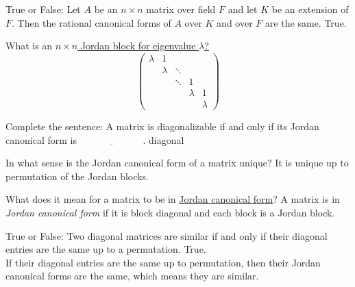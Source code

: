\documentclass[avery5371,grid]{flashcards}
\newcommand{\blank}{$\; \underline{\hspace{1in}} \; $}
\begin{document}
\begin{flashcard}{True or False: Let $A$ be an $n \times n$ matrix over field $F$ and let $K$ be an extension of $F$. Then the rational canonical forms of $A$ over $K$ and over $F$ are the same. }
 True.
\end{flashcard}

\begin{flashcard}{What is an \underline{$n \times n$ Jordan block for eigenvalue $\lambda$?}}
 $$
 \left (
 \begin{array}{ccccc}
      \lambda & 1 &&& \\
      & \lambda & \ddots && \\
      && \ddots & 1 & \\
      &&& \lambda & 1 \\
      &&&& \lambda
 \end{array}
 \right )
 $$
\end{flashcard}

\begin{flashcard}{Complete the sentence: A matrix is diagonalizable if and only if its Jordan canonical form is \blank .}
 diagonal
\end{flashcard}

\begin{flashcard}{In what sense is the Jordan canonical form of a matrix unique?}
 It is unique up to permutation of the Jordan blocks.
\end{flashcard}

\begin{flashcard}{What does it mean for a matrix to be in \underline{Jordan canonical form}?}
 A matrix is in \emph{Jordan canonical form} if it is block diagonal and each block is a Jordan block.
\end{flashcard}

\begin{flashcard}{True or False: Two diagonal matrices are similar if and only if their diagonal entries are the same up to a permutation.}
 True. \\
 
 If their diagonal entries are the same up to permutation, then their Jordan canonical forms are the same, which means they are similar.
\end{flashcard}
\end{document}
